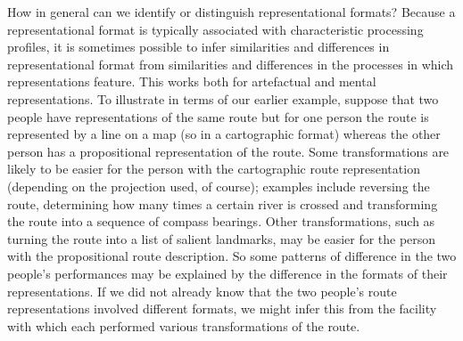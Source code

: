 \documentclass[12pt,\papersize]{extarticle}
\begin{document}
How in general can we identify or distinguish representational formats? Because a representational format is typically associated with characteristic processing profiles, it is sometimes possible to infer similarities and differences in representational format from similarities and differences in the processes in which representations feature. This works both for artefactual and mental representations.  To illustrate in terms of our earlier example, suppose that two people have representations of the same route but for one person the route is represented by a line on a map (so in a cartographic format) whereas the other person has a propositional representation of the route. Some transformations are likely to be easier for the person with the cartographic route representation (depending on the projection used, of course); examples include reversing the route, determining how many times a certain river is crossed and transforming the route into a sequence of compass bearings. Other transformations, such as turning the route into a list of salient landmarks, may be easier for the person with the propositional route description. So some patterns of difference in the two people's performances may be explained by the difference in the formats of their representations. If we did not already know that the two people's route representations involved different formats, we might infer this from the facility with which each performed various transformations of the route. 
\end{document}
